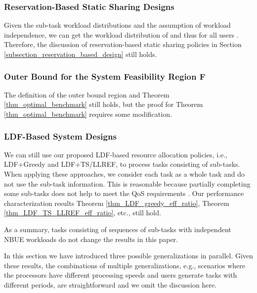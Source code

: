 \documentclass[prodmode,acmtompecs]{acmsmall}
\newcommand{\myComments}[1]{}
\newif\iftompecsonly
\newif\iftompecsextended
\newcommand{\tompecsonlyStart}{\iftompecsonly \myComments{TOMPECS only version: }}
\newcommand{\tompecsextendedStart}{\iftompecsextended  \myComments{TOMPECS extended version: }}
\newcommand{\commentEnd}{\myComments{End}}
\begin{document}
\subsubsection{Reservation-Based Static Sharing Designs}

Given the sub-task workload distributions and the assumption of workload independence, we can get the workload distribution of  and thus  for all users . Therefore, the discussion of reservation-based static sharing policies in Section \ref{subsection_reservation_based_design} still holds. 

\subsubsection{Outer Bound for the System Feasibility Region F}

The definition of the outer bound region  and Theorem \ref{thm_optimal_benchmark} still holds, but the proof for Theorem \ref{thm_optimal_benchmark} requires some modification. 
\tompecsonlyStart
See the extended version of this paper \cite{EXT} for the details. 
\commentEnd\fi
\tompecsextendedStart
See Appendix \ref{appendix_pf_R_OB_subtask_model} for the details. 
\commentEnd\fi

\subsubsection{LDF-Based System Designs}

We can still use our proposed LDF-based resource allocation policies, i.e., LDF+Greedy and LDF+TS/LLREF, to process tasks consisting of sub-tasks. When applying these approaches, we consider each task as a whole task and do not use the sub-task information. This is reasonable because partially completing some sub-tasks does not help to meet the QoS requirements . Our performance characterization results Theorem \ref{thm_LDF_greedy_eff_ratio}, Theorem \ref{thm_LDF_TS_LLREF_eff_ratio}, etc., still hold. 

As a summary, tasks consisting of sequences of sub-tasks with independent NBUE workloads do not change the results in this paper. 

In this section we have introduced three possible generalizations in parallel. Given these results, the combinations of multiple generalizations, e.g., scenarios where the processors have different processing speeds and users generate tasks with different periods, are straightforward and we omit the discussion here. 
\commentEnd\fi
\end{document}
